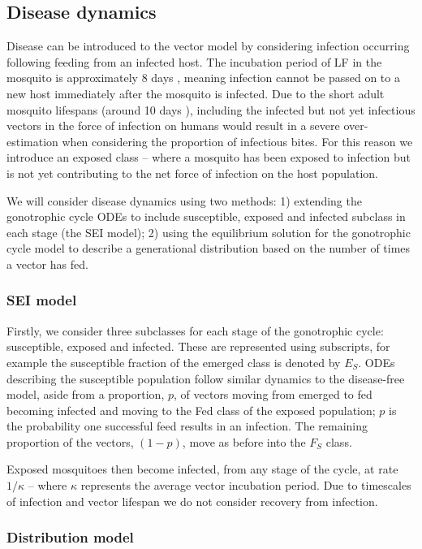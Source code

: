 \documentclass[5p,times]{elsarticle}
\begin{document}
\subsection{Disease dynamics}

Disease can be introduced to the vector model by considering infection occurring following feeding from an infected host. The incubation period of LF in the mosquito is approximately 8 days \cite{le2007,erickson2009}, meaning infection cannot be passed on to a new host immediately after the mosquito is infected. Due to the short adult mosquito lifespans (around 10 days \cite{le2007}), including the infected but not yet infectious vectors in the force of infection on humans would result in a severe over-estimation when considering the proportion of infectious bites. For this reason we introduce an exposed class -- where a mosquito has been exposed to infection but is not yet contributing to the net force of infection on the host population.

We will consider disease dynamics using two methods: 1) extending the gonotrophic cycle ODEs to include susceptible, exposed and infected subclass in each stage (the SEI model); 2) using the equilibrium solution for the gonotrophic cycle model to describe a generational distribution based on the number of times a vector has fed.

\subsubsection{SEI model}

Firstly, we consider three subclasses for each stage of the gonotrophic cycle: susceptible, exposed and infected. These are represented using subscripts, for example the susceptible fraction of the emerged class is denoted by $E_S$. ODEs describing the susceptible population follow similar dynamics to the disease-free model, aside from a proportion, $p$, of vectors moving from emerged to fed becoming infected and moving to the Fed class of the exposed population; $p$ is the probability one successful feed results in an infection. The remaining proportion of the vectors, $(1-p)$, move as before into the $F_S$ class.

Exposed mosquitoes then become infected, from any stage of the cycle, at rate $1/\kappa$ -- where $\kappa$ represents the average vector incubation period. Due to timescales of infection and vector lifespan we do not consider recovery from infection.

\subsubsection{Distribution model}
\end{document}
